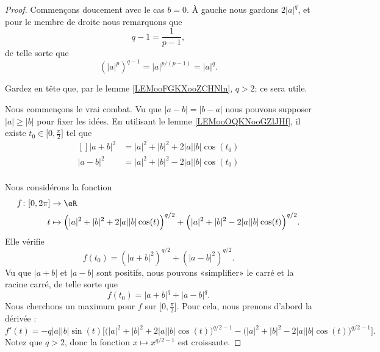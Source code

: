 \begin{proof}
	Commençons doucement avec le cas \( b=0\). À gauche nous gardons \( 2| a |^q\), et pour le membre de droite nous remarquons que
	\begin{equation}
		q-1=\frac{ 1 }{ p-1 },
	\end{equation}
	de telle sorte que
	\begin{equation}
		(| a |^p)^{q-1}=| a |^{p/(p-1)}=|a|^q.
	\end{equation}

	Gardez en tête que, par le lemme \ref{LEMooFGKXooZCHNln}, \( q>2\); ce sera utile.

	Nous commençons le vrai combat. Vu que \( | a-b |=| b-a |\) nous pouvons supposer \( | a |\geq | b |\) pour fixer les idées. En utilisant le lemme \ref{LEMooOQKNooGZlJHf}, il existe \( t_0\in\mathopen[ 0 , \frac{ \pi }{2} \mathclose]\) tel que
	\begin{equation}
		\begin{aligned}[]
			| a+b |^2 & =| a |^2+| b |^2+2| a | |b |\cos(t_0) \\
			| a-b |^2 & =| a |^2+| b |^2-2| a | |b |\cos(t_0) \\
		\end{aligned}
	\end{equation}

	Nous considérons la fonction
	\begin{equation}
		\begin{aligned}
			f\colon \mathopen[ 0 , 2\pi \mathclose] & \to \eR                                                                                                              \\
			t                                       & \mapsto \Big( | a |^2+| b |^2+2| a | |b |\cos(t) \Big)^{q/2}+  \Big( | a |^2+| b |^2-2| a | |b |\cos(t) \Big)^{q/2}.
		\end{aligned}
	\end{equation}
	Elle vérifie
	\begin{equation}
		f(t_0)=(| a+b |^2)^{q/2}+(| a-b |^2)^{q/2}.
	\end{equation}
	Vu que \( | a+b |\) et \( | a-b |\) sont positifs, nous pouvons «simplifier» le carré et la racine carré, de telle sorte que
	\begin{equation}
		f(t_0)=| a+b |^q+| a-b |^q.
	\end{equation}
	Nous cherchons un maximum pour \( f\) sur \( \mathopen[ 0 , \frac{ \pi }{2} \mathclose]\). Pour cela, nous prenons d'abord la dérivée :
	\begin{equation}
		f'(t)=-q| a | |b |\sin(t)\Big[   \big( | a |^2+| b |^2+2| a | |b |\cos(t) \big)^{q/2-1}-\big( | a |^2+| b |^2-2| a | |b |\cos(t) \big)^{q/2-1}    \Big].
	\end{equation}
	Notez que \( q>2\), donc la fonction \( x\mapsto x^{q/2-1}\) est croissante.


\end{proof}
